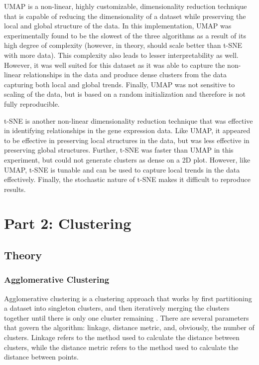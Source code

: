 \documentclass[11pt]{article}
\begin{document}
\begin{enumerate}
    UMAP is a non-linear, highly customizable, dimensionality reduction technique that is capable of reducing the dimensionality of a dataset while preserving the local and global structure of the data. In this implementation, UMAP was experimentally found to be the slowest of the three algorithms as a result of its high degree of complexity (however, in theory, should scale better than t-SNE with more data). This complexity also leads to lesser interpretability as well. However, it was well suited for this dataset as it was able to capture the non-linear relationships in the data and produce dense clusters from the data capturing both local and global trends. Finally, UMAP was not sensitive to scaling of the data, but is based on a random initialization and therefore is not fully reproducible.

    t-SNE is another non-linear dimensionality reduction technique that was effective in identifying relationships in the gene expression data. Like UMAP, it appeared to be effective in preserving local structures in the data, but was less effective in preserving global structures. Further, t-SNE was faster than UMAP in this experiment, but could not generate clusters as dense on a 2D plot. However, like UMAP, t-SNE is tunable and can be used to capture local trends in the data effectively. Finally, the stochastic nature of t-SNE makes it difficult to reproduce results.
\end{enumerate}

\section{Part 2: Clustering}
\subsection{Theory}
\subsubsection*{Agglomerative Clustering}
Agglomerative clustering is a clustering approach that works by first partitioning a dataset into singleton clusters, and then iteratively merging the clusters together until there is only one cluster remaining \cite{mullner_modern_2011}. There are several parameters that govern the algorithm: linkage, distance metric, and, obviously, the number of clusters. Linkage refers to the method used to calculate the distance between clusters, while the distance metric refers to the method used to calculate the distance between points. 
\end{document}
